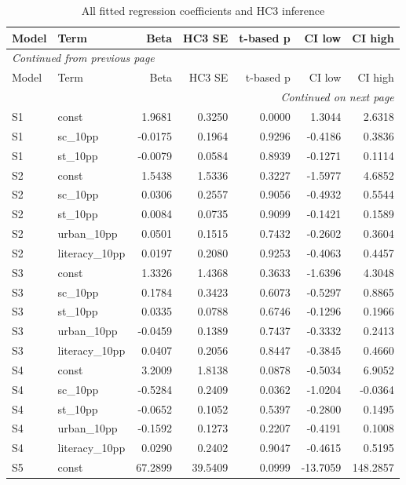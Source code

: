 \documentclass[11pt,a4paper]{report}
\begin{document}
\begin{longtable}{llrrrrr}
\caption{All fitted regression coefficients and HC3 inference}\\\toprule
Model & Term & Beta & HC3 SE & t-based p & CI low & CI high \\\midrule\endfirsthead
\multicolumn{7}{l}{\textit{Continued from previous page}}\\\toprule
Model & Term & Beta & HC3 SE & t-based p & CI low & CI high \\\midrule\endhead
\midrule\multicolumn{7}{r}{\textit{Continued on next page}}\\\endfoot\bottomrule\endlastfoot
S1 & const & 1.9681 & 0.3250 & 0.0000 & 1.3044 & 2.6318 \\
S1 & sc\_10pp & -0.0175 & 0.1964 & 0.9296 & -0.4186 & 0.3836 \\
S1 & st\_10pp & -0.0079 & 0.0584 & 0.8939 & -0.1271 & 0.1114 \\
S2 & const & 1.5438 & 1.5336 & 0.3227 & -1.5977 & 4.6852 \\
S2 & sc\_10pp & 0.0306 & 0.2557 & 0.9056 & -0.4932 & 0.5544 \\
S2 & st\_10pp & 0.0084 & 0.0735 & 0.9099 & -0.1421 & 0.1589 \\
S2 & urban\_10pp & 0.0501 & 0.1515 & 0.7432 & -0.2602 & 0.3604 \\
S2 & literacy\_10pp & 0.0197 & 0.2080 & 0.9253 & -0.4063 & 0.4457 \\
S3 & const & 1.3326 & 1.4368 & 0.3633 & -1.6396 & 4.3048 \\
S3 & sc\_10pp & 0.1784 & 0.3423 & 0.6073 & -0.5297 & 0.8865 \\
S3 & st\_10pp & 0.0335 & 0.0788 & 0.6746 & -0.1296 & 0.1966 \\
S3 & urban\_10pp & -0.0459 & 0.1389 & 0.7437 & -0.3332 & 0.2413 \\
S3 & literacy\_10pp & 0.0407 & 0.2056 & 0.8447 & -0.3845 & 0.4660 \\
S4 & const & 3.2009 & 1.8138 & 0.0878 & -0.5034 & 6.9052 \\
S4 & sc\_10pp & -0.5284 & 0.2409 & 0.0362 & -1.0204 & -0.0364 \\
S4 & st\_10pp & -0.0652 & 0.1052 & 0.5397 & -0.2800 & 0.1495 \\
S4 & urban\_10pp & -0.1592 & 0.1273 & 0.2207 & -0.4191 & 0.1008 \\
S4 & literacy\_10pp & 0.0290 & 0.2402 & 0.9047 & -0.4615 & 0.5195 \\
S5 & const & 67.2899 & 39.5409 & 0.0999 & -13.7059 & 148.2857 \\

\end{longtable}
\end{document}
